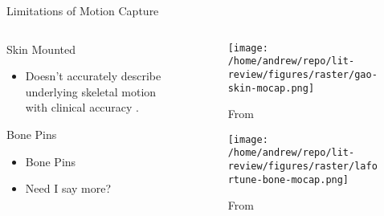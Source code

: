 \documentclass[presentation, aspectratio=1610]{beamer}
\begin{document}
\begin{frame}[label={sec:orgb06ec3d}]{Limitations of Motion Capture}
\begin{columns}
\begin{column}{0.5\columnwidth}
Skin Mounted
\begin{itemize}
\item Doesn't accurately describe underlying skeletal motion with clinical accuracy \autocites{gaoInvestigationSoftTissue2008}[][]{kuoInfluenceSoftTissue2011}[][]{linEffectsSoftTissue2016}.
\end{itemize}
Bone Pins
\begin{itemize}
\item Bone Pins
\item Need I say more?
\end{itemize}
\end{column}

\begin{column}{0.6\columnwidth}
\begin{figure}[htbp]
\centering
\texttt{[image: /home/andrew/repo/lit-review/figures/raster/gao-skin-mocap.png]}
\caption{From \autocite{gaoInvestigationSoftTissue2008}}
\end{figure}
\vspace{-0.25in}
\begin{figure}[htbp]
\centering
\texttt{[image: /home/andrew/repo/lit-review/figures/raster/lafortune-bone-mocap.png]}
\caption{From \autocite{lafortuneThreedimensionalKinematicsHuman1992}}
\end{figure}
\end{column}
\end{columns}
\end{frame}
\end{document}
